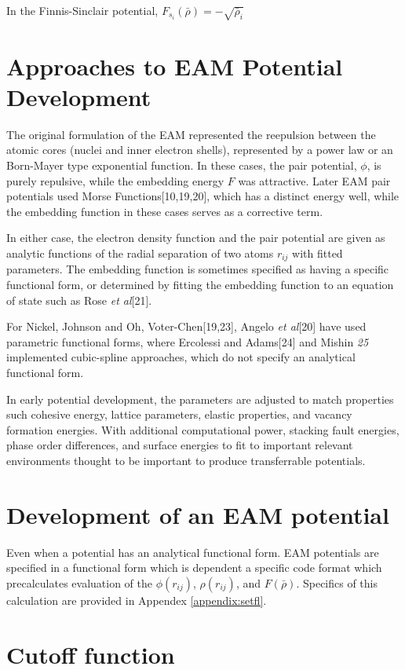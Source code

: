 In the Finnis-Sinclair potential, $F_{s_i}(\bar{\rho})=-\sqrt{\bar{\rho}_i}$

\section{Approaches to EAM Potential Development}

The original formulation of the EAM represented the reepulsion between the atomic cores (nuclei and inner electron shells), represented by a power law or an Born-Mayer type exponential function.  In these cases, the pair potential, $\phi$, is purely repulsive, while the embedding energy $F$ was attractive.
Later EAM pair potentials used Morse Functions[10,19,20], which has a distinct energy well, while the embedding function in these cases serves as a corrective term.

In either case, the electron density function and the pair potential are given as analytic functions of the radial separation of two atoms $r_{ij}$ with fitted parameters.  The embedding function is sometimes specified as having a specific functional form, or determined by fitting the embedding function to an equation of state such as Rose \emph{et al}[21].

For Nickel, Johnson and Oh\cite{johnson1989_eam_embedded_bjs}, Voter-Chen[19,23], Angelo \emph{et al}[20] have used parametric functional forms, where Ercolessi and Adams[24] and Mishin \emph{25} implemented cubic-spline approaches, which do not specify an analytical functional form.

In early potential development, the parameters are adjusted to match properties such cohesive energy, lattice parameters, elastic properties, and vacancy formation energies.  With additional computational power, stacking fault energies, phase order differences, and surface energies to fit to important relevant environments thought to be important to produce transferrable potentials.

\section{Development of an EAM potential}

Even when a potential has an analytical functional form. EAM potentials are specified in a functional form which is dependent a specific code format which precalculates evaluation of the $\phi(r_{ij})$, $\rho(r_{ij})$, and $F(\bar{\rho})$.  Specifics of this calculation are provided in Appendex \ref{appendix:setfl}.
\section{Cutoff function}




